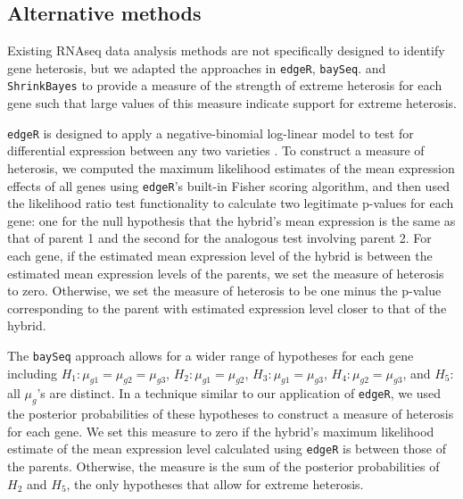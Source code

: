 \documentclass[useAMS,usenatbib,referee]{biom}
\begin{document}
\subsection{Alternative methods}
\label{s:alternative}

Existing RNAseq data analysis methods are not specifically designed to identify gene heterosis, but we adapted the approaches in {\tt edgeR}, {\tt baySeq}. and {\tt ShrinkBayes} to provide a measure of the strength of extreme heterosis for each gene such that large values of this measure indicate support for extreme heterosis.

{\tt edgeR} is designed to apply a negative-binomial log-linear model to test for differential expression between any two varieties \citep{robinson2007moderated, robinson2010edgeR}. To construct a measure of heterosis, we computed the maximum likelihood estimates of the mean expression effects of all genes using {\tt edgeR}'s built-in Fisher scoring algorithm, and then used the likelihood ratio test functionality to calculate two legitimate p-values for each gene: one for the null hypothesis that the hybrid's mean expression is the same as that of parent 1 and the second for the analogous test involving parent 2. For each gene, if the estimated mean expression level of the hybrid is between the estimated mean expression levels of the parents, we set the measure of heterosis to zero. Otherwise, we set the measure of heterosis to be one minus the p-value corresponding to the parent with estimated expression level closer to that of the hybrid. 

The {\tt baySeq} approach \citep{hardcastle2010bayseq, hardcastle2012baySeq} allows for a wider range of hypotheses for each gene including $H_1: \mu_{g1}=\mu_{g2}=\mu_{g3}$, $H_2: \mu_{g1}=\mu_{g2}$, $H_3: \mu_{g1}=\mu_{g3}$, $H_4: \mu_{g2}=\mu_{g3}$, and $H_5:$ all $\mu_g$'s are distinct. In a technique similar to our application of {\tt edgeR}, we used the posterior probabilities of these hypotheses to construct a measure of heterosis for each gene. We set this measure to zero if the hybrid's maximum likelihood estimate of the mean expression level calculated using {\tt edgeR} is between those of the parents. Otherwise, the measure is the sum of the posterior probabilities of $H_2$ and $H_5$, the only hypotheses that allow for extreme heterosis.
\end{document}
